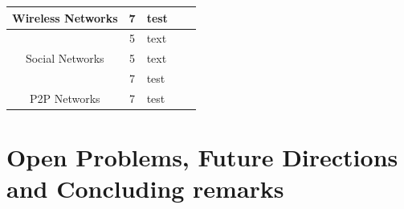\documentclass[runningheads,a4paper]{llncs}
\begin{document}
\begin{longtable}{|c|c|p{5cm}|p{3cm}|p{1cm}|}
	\multirow{1}{*}{Wireless Networks}
	& 7     
	& test                            
	&                                 
	&                       
	\\ \hline
	
	\multirow{3}{*}{Social Networks}
	& 5     
	& text                            
	&                                 
	&                       
	\\ \cline{2-5}
	& 5     
	& text                            
	&                                 
	&                       
	\\ \cline{2-5} 
	& 7     
	& test                            
	&                                 
	&                       
	\\ \hline
	
	\multirow{1}{*}{P2P Networks}
	& 7     
	& test                            
	&                                 
	&                       
	\\ \hline
\end{longtable}

\section{Open Problems, Future Directions and Concluding remarks}
%

\end{document}

